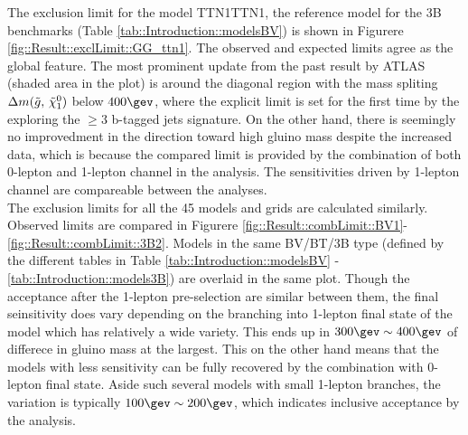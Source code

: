The exclusion limit for the model TTN1TTN1, the reference model for the 3B benchmarks (Table \ref{tab::Introduction::modelsBV}) is shown in Figurere \ref{fig::Result::exclLimit::GG_ttn1}. The observed and expected limits agree as the global feature. The most prominent update from the past result \cite{strong3B_ICHEP2016_CONF} by ATLAS (shaded area in the plot) is around the diagonal region with the mass spliting $\Delta m(\tilde{g}, \, \tilde{\chi}_{1}^{0})$ below $400\gev$, where the explicit limit is set for the first time by the exploring the $\geq 3$ b-tagged jets signature. On the other hand, there is seemingly no improvedment in the direction toward high gluino mass despite the increased data, which is because the compared limit is provided by the combination of both 0-lepton and 1-lepton channel in the analysis. The sensitivities driven by 1-lepton channel are compareable between the analyses. \\


The exclusion limits for all the 45 models and grids are calculated similarly. Observed limits are compared in Figurere \ref{fig::Result::combLimit::BV1}-\ref{fig::Result::combLimit::3B2}. Models in the same BV/BT/3B type (defined by the different tables in Table \ref{tab::Introduction::modelsBV} - \ref{tab::Introduction::models3B}) are overlaid in the same plot. Though the acceptance after the 1-lepton pre-selection are similar between them, the final seinsitivity does vary depending on the branching into 1-lepton final state of the model which has relatively a wide variety. This ends up in $300\gev\sim400\gev$ of differece in gluino mass at the largest. This on the other hand means that the models with less sensitivity can be fully recovered by the combination with 0-lepton final state. Aside such several models with small 1-lepton branches, the variation is typically $100\gev\sim200\gev$, which indicates inclusive acceptance by the analysis.







